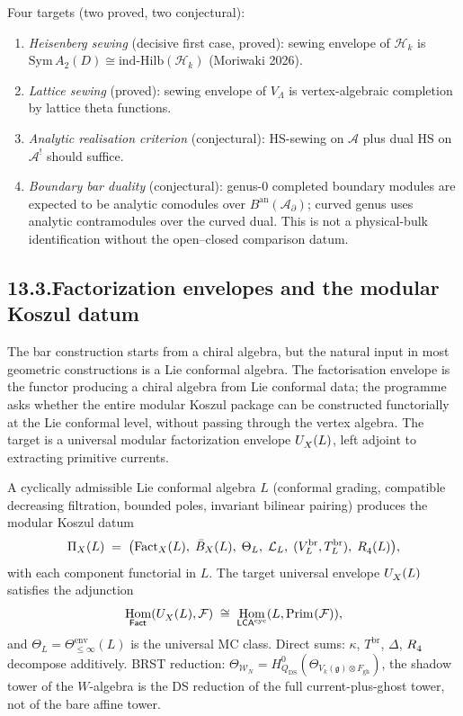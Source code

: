 \documentclass[11pt]{report}
\theoremstyle{definition}
\theoremstyle{remark}
\providecommand{\cA}{\mathcal{A}}
\providecommand{\cF}{\mathcal{F}}
\providecommand{\cH}{\mathcal{H}}
\providecommand{\cL}{\mathcal{L}}
\providecommand{\cW}{\mathcal{W}}
\providecommand{\Sym}{\mathrm{Sym}}
\providecommand{\fg}{\mathfrak{g}}
\providecommand{\cyc}{\mathrm{cyc}}
\providecommand{\gh}{\mathrm{gh}}
\providecommand{\DS}{\mathrm{DS}}
\let\mod\relax
\newcommand{\mod}{\mathrm{mod}}
\DeclareMathOperator{\Hom}{Hom}
\numberwithin{equation}{section}
\begin{document}
Four targets (two proved, two conjectural):
\begin{enumerate}[label=(\alph*),nosep]
\item \emph{Heisenberg sewing} (decisive first case, proved):
sewing envelope of $\cH_k$ is
$\Sym\,A_2(D) \cong \mathrm{ind\text{-}Hilb}(\cH_k)$
(Moriwaki 2026).
\item \emph{Lattice sewing} (proved): sewing envelope of
$V_\Lambda$ is vertex-algebraic completion by lattice theta
functions.
\item \emph{Analytic realisation criterion} (conjectural):
HS-sewing on $\cA$ plus dual HS on $\cA^!$ should suffice.
\item \emph{Boundary bar duality} (conjectural): genus-$0$
completed boundary modules are expected to be analytic comodules
over $B^{\mathrm{an}}(\cA_\partial)$; curved genus uses analytic
contramodules over the curved dual. This is not a physical-bulk
identification without the open--closed comparison datum.
\end{enumerate}

\subsection*{13.3.\enspace Factorization envelopes and the modular Koszul datum}

The bar construction starts from a chiral algebra, but the
natural input in most geometric constructions is a Lie conformal
algebra. The factorisation envelope is the functor producing a
chiral algebra from Lie conformal data; the programme asks
whether the entire modular Koszul package can be constructed
functorially at the Lie conformal level, without passing
through the vertex algebra. The target is a universal modular
factorization envelope $U^{\mod}_X(L)$, left adjoint to
extracting primitive currents.

A cyclically admissible Lie conformal algebra $L$ (conformal
grading, compatible decreasing filtration, bounded poles,
invariant bilinear pairing) produces the modular Koszul datum
\[
\Pi_X(L)
\;=\;
\bigl(
\mathrm{Fact}_X(L),\;
\bar B_X(L),\;
\Theta_L,\;
\cL_L,\;
(V^{\mathrm{br}}_L, T^{\mathrm{br}}_L),\;
R_4^{\mod}(L)
\bigr),
\]
with each component functorial in $L$. The target universal
envelope $U^{\mod}_X(L)$ satisfies the adjunction
\[
\Hom_{\mathsf{Fact}^{\mod}}(U^{\mod}_X(L), \cF)
\;\cong\;
\Hom_{\mathsf{LCA}^{\cyc}}(L, \mathrm{Prim}^{\mod}(\cF)),
\]
and $\Theta_L = \Theta^{\mathrm{env}}_{\le\infty}(L)$ is the
universal MC class. Direct sums: $\kappa$, $T^{\mathrm{br}}$,
$\Delta$, $R_4^{\mod}$ decompose additively. BRST reduction:
$\Theta_{\cW_N} = H^0_{Q_{\DS}}(\Theta_{V_k(\fg)\otimes F_{\gh}})$,
the shadow tower of the $W$-algebra is the DS reduction of
the full current-plus-ghost tower, not of the bare affine tower.
\end{document}
